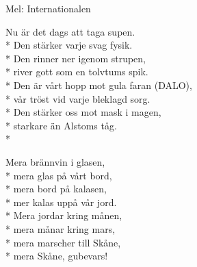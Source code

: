 \begin{SongText}
    \begin{SongInfo}
        Mel: Internationalen
    \end{SongInfo}
    \begin{SongVerse}
        Nu är det dags att taga supen.\\*%
        Den stärker varje svag fysik.\\*%
        Den rinner ner igenom strupen,\\*%
        river gott som en tolvtums spik.\\*%
        Den är vårt hopp mot gula faran (DALO),\\*%
        vår tröst vid varje bleklagd sorg.\\*%
        Den stärker oss mot mask i magen,\\*%
        starkare än Alstoms tåg.\\*%
    \end{SongVerse}
    \begin{SongVerse}
        Mera brännvin i glasen,\\*%
        mera glas på vårt bord,\\*%
        mera bord på kalasen,\\*%
        mer kalas uppå vår jord.\\*%
        Mera jordar kring månen,\\*%
        mera månar kring mars,\\*%
        mera marscher till Skåne,\\*%
        mera Skåne, gubevars!
    \end{SongVerse}
\end{SongText}